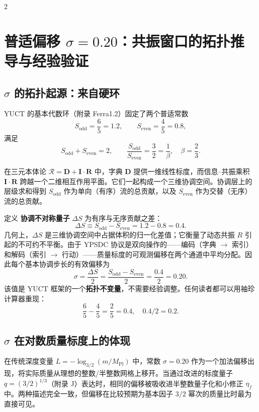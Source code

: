 \documentclass[11pt,a4paper]{article}
\begin{document}
\begin{multicols}{2}
		\section{普适偏移 \(\sigma = 0.20\)：共振窗口的拓扑推导与经验验证}
		\label{sec:sigma}
		
		\subsection{\(\sigma\) 的拓扑起源：来自硬环}
		
		YUCT 的基本代数环（附录 Ferra1.2）固定了两个普适常数
		\[
		S_{\mathrm{odd}} = \frac{6}{5} = 1.2,\qquad S_{\mathrm{even}} = \frac{4}{5} = 0.8,
		\]
		满足
		\[
		S_{\mathrm{odd}} + S_{\mathrm{even}} = 2,\qquad \frac{S_{\mathrm{odd}}}{S_{\mathrm{even}}} = \frac{3}{2} = \frac{1}{\beta},\quad \beta = \frac{2}{3}.
		\]
		
		在三元本体论 \(\mathcal{R} = \mathbf{D} + \mathbf{I}\!\cdot\!\mathbf{R}\) 中，字典 \(\mathbf{D}\) 提供一维线性标度，而信息–共振乘积 \(\mathbf{I}\!\cdot\!\mathbf{R}\) 跨越一个二维相互作用平面。它们一起构成一个三维协调空间。协调层上的层级求和得到 \(S_{\mathrm{odd}}\) 作为单向（有序）流的总贡献，以及 \(S_{\mathrm{even}}\) 作为交替（无序）流的总贡献。
		
		定义 \textbf{协调不对称量子} \(\Delta S\) 为有序与无序贡献之差：
		\begin{equation}
			\Delta S \equiv S_{\mathrm{odd}} - S_{\mathrm{even}} = 1.2 - 0.8 = 0.4.
			\label{eq:Deltas}
		\end{equation}
		几何上，\(\Delta S\) 是三维协调空间中占据体积的归一化差值；它衡量了动态共振 \(R\) 引起的不可约不平衡。由于 YPSDC 协议是双向操作的——编码（字典 $\to$ 索引）和解码（索引 $\to$ 行动）——质量标度的可观测偏移在两个通道中平均分配。因此每个基本协调步长的有效偏移为
		\begin{equation}
			\boxed{\sigma = \frac{\Delta S}{2} = \frac{S_{\mathrm{odd}} - S_{\mathrm{even}}}{2} = \frac{0.4}{2} = 0.20.}
			\label{eq:sigma}
		\end{equation}
		该值是 YUCT 框架的一个\textbf{拓扑不变量}，不需要经验调整。任何读者都可以用袖珍计算器重现：
		\[
		\frac{6}{5} - \frac{4}{5} = \frac{2}{5} = 0.4,\quad 0.4 / 2 = 0.2.
		\]
		
		\subsection{\(\sigma\) 在对数质量标度上的体现}
		
		在传统深度变量 \(L = -\log_{3/2}(m/M_{\mathrm{Pl}})\) 中，常数 \(\sigma = 0.20\) 作为一个加法偏移出现，将实际质量从理想的整数/半整数网格上移开。当通过改进的标度量子 \(q = (3/2)^{1/3}\)（附录 J）表达时，相同的偏移被吸收进半整数量子化和小修正 \(\eta_f\) 中。两种描述完全一致，但偏移在比较预期为基本因子 \(3/2\) 幂次的质量比时最为直接可见。
		

\end{multicols}
\end{document}
